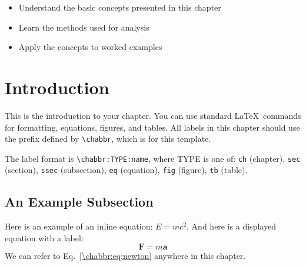 \begin{learningobjectives}
{\begin{itemize}
    \item[{\color{OCBurntOrange}\ref{\chabbr:sec:introduction}:}] Understand the basic concepts presented in this chapter
    \item[{\color{OCBurntOrange}\ref{\chabbr:sec:methods}:}] Learn the methods used for analysis
    \item[{\color{OCBurntOrange}\ref{\chabbr:sec:examples}:}] Apply the concepts to worked examples
\end{itemize}}
\end{learningobjectives}


\section{Introduction}\label{\chabbr:sec:introduction}

This is the introduction to your chapter.  You can use standard \LaTeX\ commands
for formatting, equations, figures, and tables.  All labels in this chapter should
use the prefix defined by \texttt{\textbackslash chabbr}, which is \texttt{\chabbr}
for this template.

The label format is \texttt{\textbackslash chabbr:TYPE:name}, where TYPE is one of:
\texttt{ch} (chapter), \texttt{sec} (section), \texttt{ssec} (subsection),
\texttt{eq} (equation), \texttt{fig} (figure), \texttt{tb} (table).

\subsection{An Example Subsection}\label{\chabbr:ssec:example}

Here is an example of an inline equation: $E = mc^2$.  And here is a displayed
equation with a label:
\begin{equation}
    \mathbf{F} = m\mathbf{a}
    \label{\chabbr:eq:newton}
\end{equation}
We can refer to Eq.~\ref{\chabbr:eq:newton} anywhere in this chapter.

